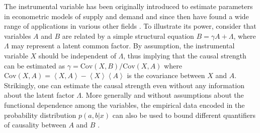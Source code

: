 \documentclass[letterpaper]{article}
\newcommand{\mean}[1]{\left\langle #1 \right\rangle}
\begin{document}
The instrumental variable has been originally introduced to estimate parameters in econometric models of supply and demand \cite{} and since then have found a wide range of applications in various other fields \cite{}. To illustrate its power, consider that variables $A$ and $B$ are related by a simple structural equation $B=\gamma A +\Lambda$, where $\Lambda$ may represent a latent common factor. By assumption, the instrumental variable $X$ should be independent of $\Lambda$, thus implying that the causal strength can be estimated as $\gamma= \mathrm{Cov}(X,B)/\mathrm{Cov}(X,A)$ where $\mathrm{Cov}(X,A)= \mean{X,A} - \mean{X}\mean{A}$ is the covariance between $X$ and $A$. Strikingly, one can estimate the causal strength even without any information about the latent factor $\Lambda$. More generally and without assumptions about the functional dependence among the variables, the empirical data encoded in the probability distribution $p(a,b \vert x)$ can also be used to bound different quantifiers of causality between $A$ and $B$ \cite{}.


\end{document}
